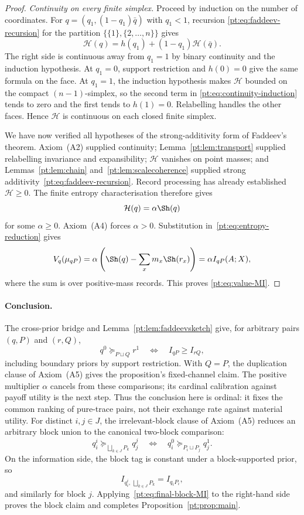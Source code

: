 \begin{proof}
\emph{Continuity on every finite simplex.}
Proceed by induction on the number of coordinates.  For
$q=(q_1,(1-q_1)\bar q)$ with $q_1<1$, recursion
\eqref{pt:eq:faddeev-recursion} for the partition
$\{\{1\},\{2,\ldots,n\}\}$ gives
\begin{equation}
 \mathcal H(q)=h(q_1)+(1-q_1)\mathcal H(\bar q).
\label{pt:eq:continuity-induction}
\end{equation}
The right side is continuous away from $q_1=1$ by binary continuity and the
induction hypothesis.  At $q_1=0$, support restriction and $h(0)=0$ give
the same formula on the face.  At $q_1=1$, the induction hypothesis makes
$\mathcal H$ bounded on the compact $(n-1)$-simplex, so the second term in
\eqref{pt:eq:continuity-induction} tends to zero and the first tends to
$h(1)=0$.  Relabelling handles the other faces.  Hence $\mathcal H$ is
continuous on each closed finite simplex.

We have now verified all hypotheses of the strong-additivity form of
Faddeev's theorem.  Axiom~\textup{(A2)} supplied continuity;
Lemma~\ref{pt:lem:transport} supplied relabelling invariance and
expansibility; $\mathcal H$ vanishes on point masses; and
Lemmas~\ref{pt:lem:chain} and~\ref{pt:lem:scalecoherence} supplied strong
additivity~\eqref{pt:eq:faddeev-recursion}.  Record processing has already
established $\mathcal H\ge0$.  The finite entropy characterisation
\cite[Theorem~6]{BaezFritzLeinster2011} therefore gives
\[
 \mathcal H(q)=\alpha\Sh(q)
\]
for some $\alpha\ge0$.  Axiom~\textup{(A4)} forces $\alpha>0$.
Substitution in~\eqref{pt:eq:entropy-reduction} gives
\[
 V_q(\mu_{qP})
 =\alpha\left(\Sh(q)-\sum_x m_x\Sh(r_x)\right)
 =\alpha I_{qP}(A;X),
\]
where the sum is over positive-mass records.  This proves
\eqref{pt:eq:value-MI}.
\end{proof}

\paragraph{Conclusion.}
The cross-prior bridge and Lemma~\ref{pt:lem:faddeevsketch} give, for arbitrary
pairs $(q,P)$ and $(r,Q)$,
\[
 q^0\succeq_{P\sqcup Q}r^1
 \quad\Longleftrightarrow\quad
 I_{qP}\ge I_{rQ},
\tag{BMI}\label{pt:eq:final-block-MI}
\]
including boundary priors by support restriction.  With $Q=P$, the
duplication clause of Axiom~\textup{(A5)} gives the proposition's fixed-channel
claim.  The positive multiplier $\alpha$ cancels from these comparisons; its
cardinal calibration against payoff utility is the next step.  Thus the
conclusion here is ordinal: it fixes the common ranking of pure-trace pairs,
not their exchange rate against material utility.  For distinct
$i,j\in J$, the irrelevant-block clause of Axiom~\textup{(A5)} reduces an
arbitrary block union to the canonical two-block comparison:
\[
 q_i^i\succeq_{\bigsqcup_{k\in J}P_k}q_j^j
 \quad\Longleftrightarrow\quad
 q_i^0\succeq_{P_i\sqcup P_j}q_j^1.
\]
On the information side, the block tag is constant under a block-supported
prior, so
\[
 I_{q_i^i,\,\bigsqcup_{k\in J}P_k}=I_{q_iP_i},
\]
and similarly for block $j$.  Applying~\eqref{pt:eq:final-block-MI} to the
right-hand side proves the block claim and completes
Proposition~\ref{pt:prop:main}.
